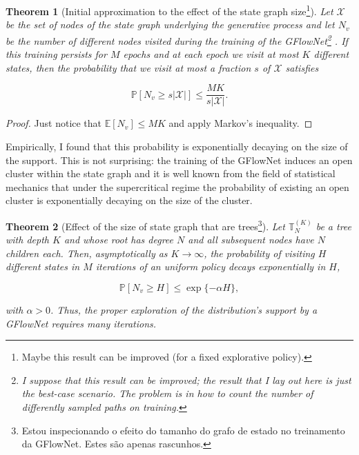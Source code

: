 \documentclass{article} %
\newtheorem{theorem}{Theorem}
\theoremstyle{definition}
\begin{document}
\begin{theorem}[Initial approximation to the effect of the state graph size\footnote{Maybe this result can be improved (for a fixed explorative policy).}] 
    Let $\mathcal{X}$ be the set of nodes of the state graph underlying the generative process and
    let $N_{v}$ be the number of different nodes visited during the training of the GFlowNet\footnote{I suppose that
    this result can be improved; the result that I lay out here is just the best-case scenario. The problem is in how to
count the number of differently sampled paths on training.} . If this 
    training persists for $M$ epochs and at each epoch we visit at most $K$ different states, 
    then the probability that we visit at most a fraction $s$ of $\mathcal{X}$ satisfies 

    \begin{equation*}
        \mathbb{P}[N_{v} \ge s |\mathcal{X}|] \le \frac{MK}{s|\mathcal{X}|}. 
    \end{equation*}
\end{theorem}

\begin{proof}
    Just notice that $\mathbb{E}[N_{v}] \le MK$ and apply 
    Markov's inequality. 
\end{proof}

Empirically, I found that this probability is exponentially decaying on the size of the support. This is not surprising:
the training of the GFlowNet induces an open cluster within the state graph and it is well known from the field of
statistical mechanics that under the supercritical regime the probability of existing an open cluster is exponentially
decaying on the size of the cluster. 

\begin{theorem}[Effect of the size of state graph that are trees\footnote{Estou inspecionando o efeito do tamanho do grafo de estado no treinamento da GFlowNet. Estes são apenas rascunhos.}]
    Let $\mathbb{T}_{N}^{(K)}$ be a tree with depth $K$ and whose root has degree $N$ and all subsequent nodes have $N$ children each. Then, asymptotically as $K \rightarrow \infty$, the
    probability of visiting $H$ different states in $M$ iterations of an uniform policy decays exponentially in $H$, 

    \begin{equation*}
        \mathbb{P}[N_{v} \ge H] \le \exp\{-\alpha H\}, %
    \end{equation*}
    
    \noindent with $\alpha > 0$. Thus, the proper exploration of the distribution's support by a GFlowNet requires
    \textit{many} iterations. 
\end{theorem}
\end{document}
